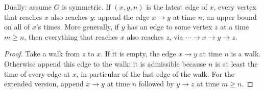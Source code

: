\begin{lemma}
  \label{lem:reachable-of-latestEdge}
  \leanok
  Dually: assume $G$ is symmetric. If $(x,y,n)$ is the latest edge of $x$,
  every vertex that reaches $x$ also reaches $y$: append the edge $x \to y$
  at time $n$, an upper bound on all of $x$'s times. More generally, if $y$
  has an edge to some vertex $z$ at a time $m \ge n$, then everything that
  reaches $x$ also reaches $z$, via $\cdots \to x \to y \to z$.
\end{lemma}

\begin{proof}
  \leanok
  Take a walk from $z$ to $x$. If it is empty, the edge $x \to y$ at time $n$ is a walk. Otherwise append this edge to the walk: it is admissible because $n$ is at least the time of every edge at $x$, in particular of the last edge of the walk. For the extended version, append $x \to y$ at time $n$ followed by $y \to z$ at time $m \ge n$.
\end{proof}
